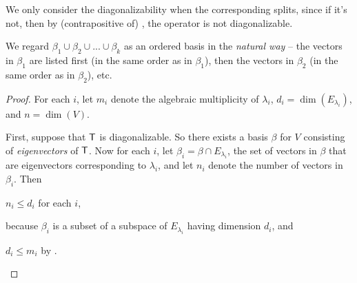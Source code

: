 \begin{remark} \label{remark 5.2.6}
We only consider the diagonalizability when the corresponding \CPOLY{} splits, since if it's not, then by (contrapositive of) , the operator is not diagonalizable.
\end{remark}

\begin{remark} \label{remark 5.2.7}
\RED{*}We regard \(\beta_1 \cup \beta_2 \cup ... \cup \beta_k\) as an ordered basis in the \emph{natural way} -- the vectors in \(\beta_1\) are listed first (in the same order as in \(\beta_1\)), then the vectors in \(\beta_2\) (in the same order as in \(\beta_2\)), etc.
\end{remark}

\begin{proof}
For each \(i\), let \(m_i\) denote the algebraic multiplicity of \(\lambda_i\), \(d_i = \dim(E_{\lambda_i})\), and \(n = \dim(V)\).

First, suppose that \(\textsf{T}\) is diagonalizable.
So there exists a basis \(\beta\) for \(V\) consisting of \emph{eigenvectors} of \(\textsf{T}\).
Now for each \(i\), let \(\beta_i = \beta \cap E_{\lambda_i}\), the set of vectors in \(\beta\) that are eigenvectors corresponding to \(\lambda_i\),
and let \(n_i\) denote the number of vectors in \(\beta_i\).
Then
\begin{center}
    \(n_i \le d_i\) for each \(i\), \quad \quad {}
\end{center}
because \(\beta_i\) is a \LID{} subset of a subspace of \(E_{\lambda_i}\) having dimension \(d_i\), and
\begin{center}
    \(d_i \le m_i\) by . \quad \quad {}
\end{center}


\end{proof}
